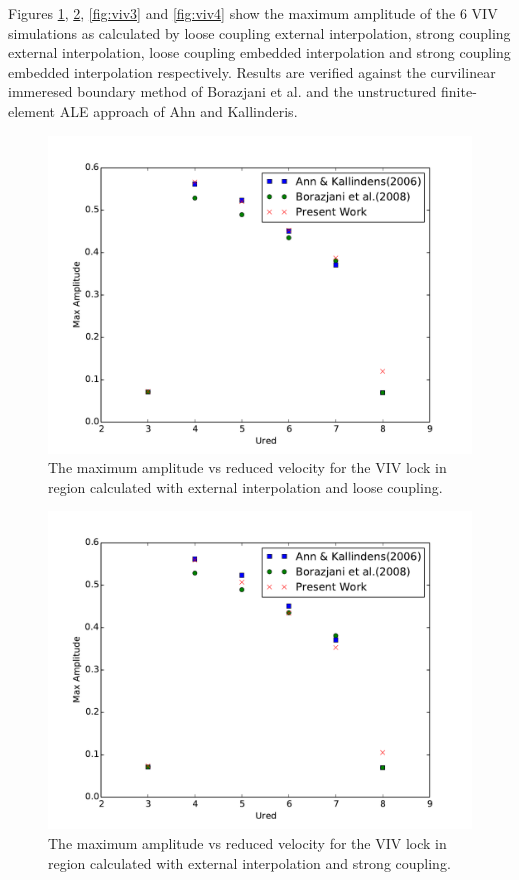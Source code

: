 \documentclass[onehalf,11pt]{beavtex}
\begin{document}
Figures \ref{fig:viv1}, \ref{fig:viv2}, \ref{fig:viv3} and \ref{fig:viv4} show the maximum amplitude of the 6 VIV simulations as calculated by loose coupling external interpolation, strong coupling external interpolation, loose coupling embedded interpolation and strong coupling embedded interpolation respectively.
Results are verified against the curvilinear immeresed boundary method of Borazjani et al.\cite{borazjani2008curvilinear} and the unstructured finite-element ALE approach of Ahn and Kallinderis\cite{ahn2006strongly}.
\begin{figure}
	\centering
	\includegraphics[width=\textwidth]{vivexlc}
	\caption{The maximum amplitude vs reduced velocity for the VIV lock in region calculated with external interpolation and loose coupling.}
	\label{fig:viv1}
\end{figure}
\begin{figure}
	\centering
	\includegraphics[width=\textwidth]{vivexsc}
	\caption{The maximum amplitude vs reduced velocity for the VIV lock in region calculated with external interpolation and strong coupling.}
	\label{fig:viv2}
\end{figure}
\end{document}
